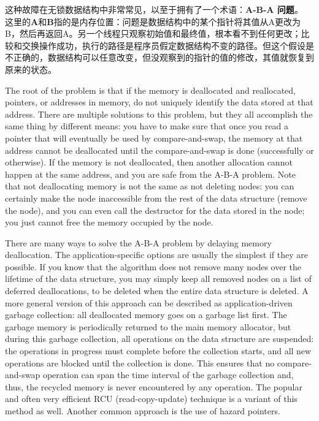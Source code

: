 这种故障在无锁数据结构中非常常见，以至于拥有了一个术语：\textbf{A-B-A 问题}。 这里的\textbf{A}和\textbf{B}指的是内存位置：问题是数据结构中的某个指针将其值从A更改为B，然后再返回A。另一个线程只观察初始值和最终值，根本看不到任何更改；比较和交换操作成功，执行的路径是程序员假定数据结构不变的路径。但这个假设是不正确的，数据结构可以任意改变，但没观察到的指针的值的修改，其值就恢复到原来的状态。

The root of the problem is that if the memory is deallocated and reallocated, pointers, or addresses in memory, do not uniquely identify the data stored at that address. There are multiple solutions to this problem, but they all accomplish the same thing by different means: you have to make sure that once you read a pointer that will eventually be used by compare-and-swap, the memory at that address cannot be deallocated until the compare-and-swap is done (successfully or otherwise). If the memory is not deallocated, then another allocation cannot happen at the same address, and you are safe from the A-B-A problem. Note that not deallocating memory is not the same as not deleting nodes: you can certainly make the node inaccessible from the rest of the data structure (remove the node), and you can even call the destructor for the data stored in the node; you just  cannot free the memory occupied by the node. 

There are many ways to solve the A-B-A problem by delaying memory deallocation. The application-specific options are usually the simplest if they are possible. If you know that the algorithm does not remove many nodes over the lifetime of the data structure, you may simply keep all removed nodes on a list of deferred deallocations, to be deleted when the entire data structure is deleted. A more general version of this approach can be described as application-driven garbage collection: all deallocated memory goes on a garbage list first. The garbage memory is periodically returned to the main memory allocator, but during this garbage collection, all operations on the data structure are suspended: the operations in progress must complete before the collection starts, and all new operations are blocked until the collection is done. This ensures that no compare-and-swap operation can span the time interval of the garbage collection and, thus, the recycled memory is never encountered by any operation. The popular and often very efficient RCU (read-copy-update) technique is a variant of this method as well. Another common approach is the use of hazard pointers.

